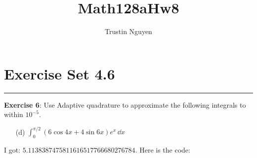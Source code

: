 \documentclass{article}
\title{Math128aHw8}
\author{Trustin Nguyen}
\begin{document}
    \maketitle

\reversemarginpar

\section*{Exercise Set 4.6}
\hrule

\textbf{Exercise 6}: Use Adaptive quadrature to approximate the following integrals to within $10^{-5}$.
    \begin{itemize}
        \item [(d)] $\int_{0}^{\pi/2} (6\cos{4x} + 4 \sin{6x})e^{x} \, \dd{x}$
    \end{itemize}
    I got: $5.1138387475811616517766680276784$. Here is the code:
    \inputminted{matlab}{./code/AdaptiveQuadrature/Simpson.m}
    \inputminted{matlab}{./code/script1.m}
\end{document}
